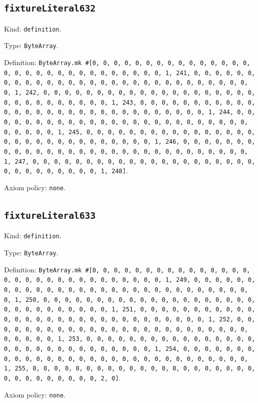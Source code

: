 \documentclass[11pt]{article}
\begin{document}
\subsection*{\texttt{fixtureLiteral632}}
\noindent Kind: \texttt{definition}.\par
\noindent Type: \texttt{ByteArray}.\par
\noindent Definition: \texttt{ByteArray.mk \#[0, 0, 0, 0, 0, 0, 0, 0, 0, 0, 0, 0, 0, 0, 0, 0, 0, 0, 0, 0, 0, 0, 0, 0, 0, 0, 0, 0, 0, 0, 1, 241, 0, 0, 0, 0, 0, 0, 0, 0, 0, 0, 0, 0, 0, 0, 0, 0, 0, 0, 0, 0, 0, 0, 0, 0, 0, 0, 0, 0, 0, 0, 1, 242, 0, 0, 0, 0, 0, 0, 0, 0, 0, 0, 0, 0, 0, 0, 0, 0, 0, 0, 0, 0, 0, 0, 0, 0, 0, 0, 0, 0, 0, 0, 1, 243, 0, 0, 0, 0, 0, 0, 0, 0, 0, 0, 0, 0, 0, 0, 0, 0, 0, 0, 0, 0, 0, 0, 0, 0, 0, 0, 0, 0, 0, 0, 1, 244, 0, 0, 0, 0, 0, 0, 0, 0, 0, 0, 0, 0, 0, 0, 0, 0, 0, 0, 0, 0, 0, 0, 0, 0, 0, 0, 0, 0, 0, 0, 1, 245, 0, 0, 0, 0, 0, 0, 0, 0, 0, 0, 0, 0, 0, 0, 0, 0, 0, 0, 0, 0, 0, 0, 0, 0, 0, 0, 0, 0, 0, 0, 1, 246, 0, 0, 0, 0, 0, 0, 0, 0, 0, 0, 0, 0, 0, 0, 0, 0, 0, 0, 0, 0, 0, 0, 0, 0, 0, 0, 0, 0, 0, 0, 1, 247, 0, 0, 0, 0, 0, 0, 0, 0, 0, 0, 0, 0, 0, 0, 0, 0, 0, 0, 0, 0, 0, 0, 0, 0, 0, 0, 0, 0, 0, 0, 1, 248]}.\par
\noindent Axiom policy: \texttt{none}.\par
\subsection*{\texttt{fixtureLiteral633}}
\noindent Kind: \texttt{definition}.\par
\noindent Type: \texttt{ByteArray}.\par
\noindent Definition: \texttt{ByteArray.mk \#[0, 0, 0, 0, 0, 0, 0, 0, 0, 0, 0, 0, 0, 0, 0, 0, 0, 0, 0, 0, 0, 0, 0, 0, 0, 0, 0, 0, 0, 0, 1, 249, 0, 0, 0, 0, 0, 0, 0, 0, 0, 0, 0, 0, 0, 0, 0, 0, 0, 0, 0, 0, 0, 0, 0, 0, 0, 0, 0, 0, 0, 0, 1, 250, 0, 0, 0, 0, 0, 0, 0, 0, 0, 0, 0, 0, 0, 0, 0, 0, 0, 0, 0, 0, 0, 0, 0, 0, 0, 0, 0, 0, 0, 0, 1, 251, 0, 0, 0, 0, 0, 0, 0, 0, 0, 0, 0, 0, 0, 0, 0, 0, 0, 0, 0, 0, 0, 0, 0, 0, 0, 0, 0, 0, 0, 0, 1, 252, 0, 0, 0, 0, 0, 0, 0, 0, 0, 0, 0, 0, 0, 0, 0, 0, 0, 0, 0, 0, 0, 0, 0, 0, 0, 0, 0, 0, 0, 0, 1, 253, 0, 0, 0, 0, 0, 0, 0, 0, 0, 0, 0, 0, 0, 0, 0, 0, 0, 0, 0, 0, 0, 0, 0, 0, 0, 0, 0, 0, 0, 0, 1, 254, 0, 0, 0, 0, 0, 0, 0, 0, 0, 0, 0, 0, 0, 0, 0, 0, 0, 0, 0, 0, 0, 0, 0, 0, 0, 0, 0, 0, 0, 0, 1, 255, 0, 0, 0, 0, 0, 0, 0, 0, 0, 0, 0, 0, 0, 0, 0, 0, 0, 0, 0, 0, 0, 0, 0, 0, 0, 0, 0, 0, 0, 0, 2, 0]}.\par
\noindent Axiom policy: \texttt{none}.\par
\end{document}
